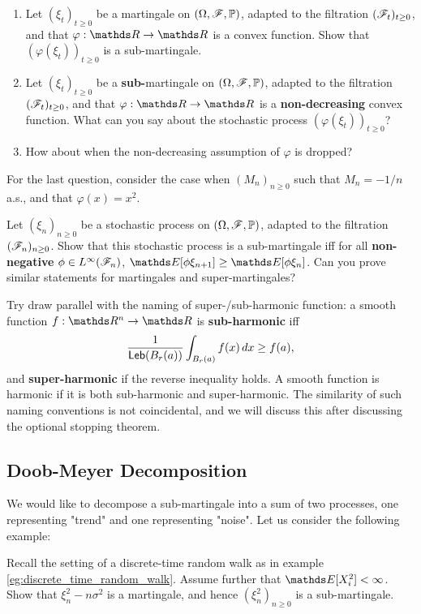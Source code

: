 \begin{exercise}
\begin{enumerate}
\item Let $(\xi_{t})_{t\geq 0}$ be a martingale on $(\Omega,\mathcal{F},\mathbb{P})$, adapted to the filtration $(\mathcal{F}_t)_{t\geq 0}$, and that $\varphi:\R\to\R$ is a convex function. Show that $(\varphi(\xi_t))_{t\geq 0}$ is a sub-martingale.
\item Let $(\xi_{t})_{t\geq 0}$ be a \textbf{sub-}martingale on $(\Omega,\mathcal{F},\mathbb{P})$, adapted to the filtration $(\mathcal{F}_t)_{t\geq 0}$, and that $\varphi:\R\to\R$ is a \textbf{non-decreasing} convex function. What can you say about the stochastic process $(\varphi(\xi_t))_{t\geq 0}$?
\item How about when the non-decreasing assumption of $\varphi$ is dropped? 
\end{enumerate}
\end{exercise}

\begin{hint}
For the last question, consider the case when $(M_n)_{n\geq 0}$ such that $M_n = -1/n$ a.s., and that $\varphi(x) = x^2$.
\end{hint}

\begin{exercise}
Let $(\xi_n)_{n\geq 0}$ be a stochastic process on $(\Omega,\mathcal{F},\mathbb{P})$, adapted to the filtration $(\mathcal{F}_n)_{n\geq 0}$. Show that this stochastic process is a sub-martingale iff for all \textbf{non-negative} $\phi \in L^\infty(\mathcal{F}_n)$, $\E[\phi \xi_{n+1}] \geq \E[\phi \xi_n]$. Can you prove similar statements for martingales and super-martingales?
\end{exercise}

\begin{remark}
Try draw parallel with the naming of super-/sub-harmonic function: a smooth function $f:\R^n \to \R$ is \textbf{sub-harmonic} iff
\begin{equation}
    \frac{1}{\mathsf{Leb}(B_r(a))} \int_{B_r(a)} f(x) \, dx \geq f(a),
\end{equation}
and \textbf{super-harmonic} if the reverse inequality holds. A smooth function is harmonic if it is both sub-harmonic and super-harmonic. The similarity of such naming conventions is not coincidental, and we will discuss this after discussing the optional stopping theorem.
\end{remark}

\subsection{Doob-Meyer Decomposition}
We would like to decompose a sub-martingale into a sum of two processes, one representing "trend" and one representing "noise". Let us consider the following example:
\begin{exercise}
Recall the setting of a discrete-time random walk as in example \ref{eg:discrete_time_random_walk}. Assume further that $\E[X_i^2] < \infty$. Show that $\xi_n^2 - n\sigma^2$ is a martingale, and hence $(\xi_n^2)_{n\geq 0}$ is a sub-martingale.
\end{exercise}


